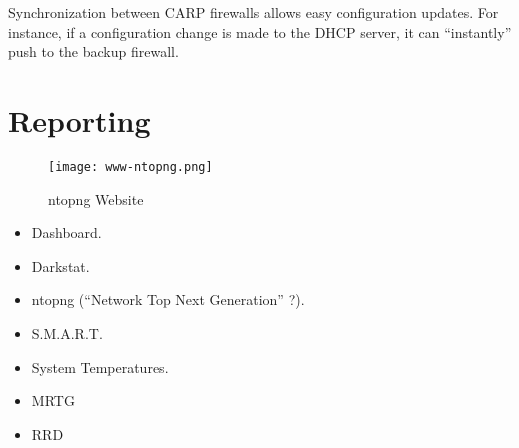 Synchronization between CARP firewalls allows easy configuration updates. For
instance, if a configuration change is made to the DHCP server, it can
``instantly'' push to the backup firewall.


\section{Reporting}

\begin{figure}[h!]
\texttt{[image: www-ntopng.png]}
 \caption{ntopng Website}
 \label{fig:www-ntopng}
\end{figure}

\begin{itemize}
 \item Dashboard.
 \item Darkstat.
 \item ntopng (``Network Top Next Generation'' ?).
 \item S.M.A.R.T.
 \item System Temperatures.
 \item MRTG
 \item RRD
\end{itemize}


